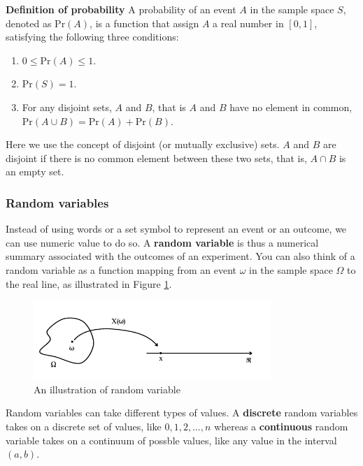 \documentclass[a4paper,11pt]{article}
\begin{document}
\textbf{Definition of probability} A probability of an event \(A\)
in the sample space \(S\), denoted as \(\mathrm{Pr}(A)\), is a function
that assign \(A\) a real number in \([0, 1]\), satisfying the following
three conditions:
\begin{enumerate}
\item \(0 \leq \mathrm{Pr}(A) \leq 1\).
\item \(\mathrm{Pr}(S) = 1\).
\item For any disjoint sets, \(A\) and \(B\), that is \(A\) and \(B\) have no
element in common, \(\mathrm{Pr}(A \cup B) = \mathrm{Pr}(A) +
  \mathrm{Pr}(B)\).
\end{enumerate}

Here we use the concept of disjoint (or mutually exclusive) sets. \(A\)
and \(B\) are disjoint if there is no common element between these two
sets, that is, \(A \cap B\) is an empty set. 

\subsubsection*{Random variables}
\label{sec:org4b8d903}

Instead of using words or a set symbol to represent an event or an
outcome, we can use numeric value to do so. A \textbf{random variable} is
thus a numerical summary associated with the outcomes of an
experiment. You can also think of a random variable as a function
mapping from an event \(\omega\) in the sample space \(\Omega\) to the
real line, as illustrated in Figure \ref{fig:orgf661861}. 

\begin{figure}[htbp]
\centering
\includegraphics[width=0.8\textwidth]{figure/random_variable_demo1.png}
\caption{\label{fig:orgf661861}
An illustration of random variable}
\end{figure}

Random variables can take different types of values. A \textbf{discrete} random
variables takes on a discrete set of values, like \(0, 1, 2, \ldots, n\)
whereas a \textbf{continuous} random variable takes on a continuum of possble
values, like any value in the interval \((a, b)\). 
\end{document}
